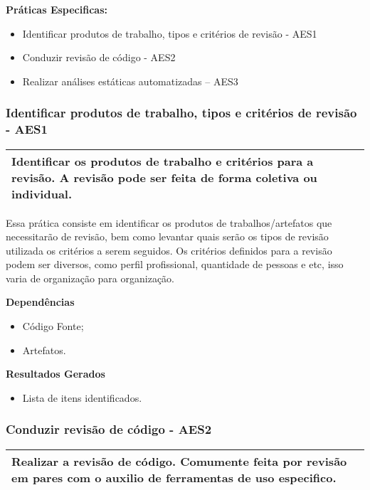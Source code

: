 \textbf{Práticas Especificas:}
\begin{itemize}
    \item Identificar produtos de trabalho, tipos e critérios de revisão - AES1
    \item Conduzir revisão de código - AES2
    \item Realizar análises estáticas automatizadas – AES3
\end{itemize}

\subsubsection{Identificar produtos de trabalho, tipos e critérios de revisão - AES1}
\label{sec:aes1}

\begin{table}[!ht]
\centering
\begin{tabular}{|p{130mm}|}
\hline
Identificar os produtos de trabalho e critérios para a revisão. A revisão pode ser feita de forma coletiva ou individual. \\ 
\hline
\end{tabular}
\end{table}

Essa prática consiste em identificar os produtos de trabalhos/artefatos que necessitarão de revisão, bem como levantar quais serão os tipos de revisão utilizada os critérios a serem seguidos. Os critérios definidos para a revisão podem ser diversos, como perfil profissional, quantidade de pessoas e etc, isso varia de organização para organização.

\textbf{Dependências}
\begin{itemize}
    \item Código Fonte;
    \item Artefatos.
\end{itemize}


\textbf{Resultados Gerados}
\begin{itemize}
    \item Lista de itens identificados.
\end{itemize}

\subsubsection{Conduzir revisão de código - AES2}
\label{sec:aes2}

\begin{table}[!ht]
\centering
\begin{tabular}{|p{130mm}|}
\hline
Realizar a revisão de código. Comumente feita por revisão em pares com o auxilio de ferramentas de uso especifico. \\
\hline
\end{tabular}
\end{table}

